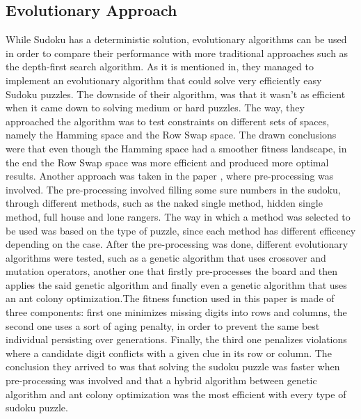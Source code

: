 \subsection{Evolutionary Approach}
{While Sudoku has a deterministic solution, evolutionary algorithms can be used in order to compare their performance with more traditional approaches such as the depth-first search algorithm. As it is mentioned in\cite{Moraglio}, they managed to implement an evolutionary algorithm that could solve very efficiently easy Sudoku puzzles. The downside of their algorithm, was that it wasn't as efficient when it came down to solving medium or hard puzzles.
The way, they approached the algorithm \cite{Moraglio} was to test constraints on different sets of spaces, namely the Hamming space and the Row Swap space. The drawn conclusions were that even though the Hamming space had a smoother fitness landscape, in the end the Row Swap space was more efficient and produced more optimal results.}
{\newline}
{\newline Another approach was taken in the paper \cite{Amil2019}, where pre-processing was involved. The pre-processing involved filling some sure numbers in the sudoku, through different methods, such as the naked single method, hidden single method, full house and lone rangers. The way in which a method was selected to be used was based on the type of puzzle, since each method has different efficency depending on the case.
After the pre-processing was done, different evolutionary algorithms were tested, such as a genetic algorithm that uses crossover and mutation operators, another one that firstly pre-processes the board and then applies the said genetic algorithm and finally even a genetic algorithm that uses an ant colony optimization.The fitness function used in this paper is made of three components: first one minimizes missing digits into rows and columns, the second one uses a sort of aging penalty, in order to prevent the same best individual persisting over generations. Finally, the third one penalizes violations where a candidate digit conflicts with a given clue in its row or column.
The conclusion they arrived to was that solving the sudoku puzzle was faster when pre-processing was involved and that a hybrid algorithm between genetic algorithm and ant colony optimization was the most efficient with every type of sudoku puzzle.  }
{\newline}
